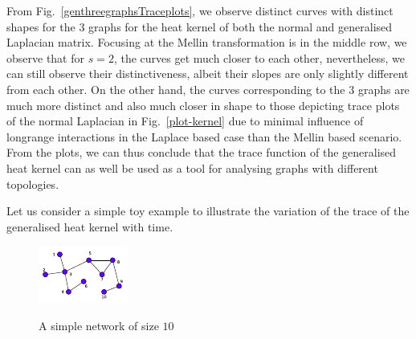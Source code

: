 \documentclass[10pt,a4paper]{article}
\theoremstyle{plain}
\theoremstyle{definition}
\begin{document}
        From Fig.~\ref{genthreegraphsTraceplots}, we observe distinct curves with distinct shapes for the $3$ graphs for the heat kernel of both the normal and generalised Laplacian matrix.
Focusing at the Mellin transformation is in the middle row, we observe that for $s=2$, the curves get much closer to each other, nevertheless,  we can still observe their distinctiveness, albeit their slopes are only slightly different from each other. On the other hand, the curves corresponding to the $3$ graphs are much more distinct and also much closer in shape to those depicting trace plots of the normal Laplacian in Fig.~\ref{plot-kernel} due to minimal influence of longrange interactions in the Laplace based case than the Mellin based scenario. From the plots, we can thus conclude that the trace function of the generalised heat kernel can as well be used as a tool for analysing graphs with different topologies.
        
        
        Let us consider a simple toy example to illustrate the variation of the trace of the generalised heat kernel with time.
        \begin{figure}[H]
        	\centering
        	\includegraphics[width= 0.35 \textwidth]{images/diffusion-graph.pdf}
        	\label{keneltoymodel2}
        	\caption{A simple network of size $10$}
        	\label{gen-sample-graph}
        \end{figure}
        
\end{document}
